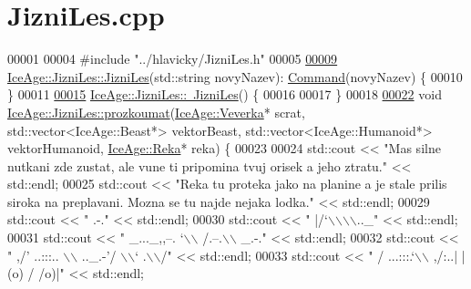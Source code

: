 \hypertarget{JizniLes_8cpp_source}{}\section{Jizni\+Les.\+cpp}
\label{JizniLes_8cpp_source}

\begin{DoxyCode}
00001 
00004 \textcolor{preprocessor}{#include "../hlavicky/JizniLes.h"}
00005 
\hypertarget{JizniLes_8cpp_source.tex_l00009}{}\hyperlink{classIceAge_1_1JizniLes_a79d20a1e507be9604e9a7b4a1d4068b0}{00009} \hyperlink{classIceAge_1_1JizniLes_a79d20a1e507be9604e9a7b4a1d4068b0}{IceAge::JizniLes::JizniLes}(std::string novyNazev):
      \hyperlink{classIceAge_1_1Command}{Command}(novyNazev) \{
00010 \}
00011 
\hypertarget{JizniLes_8cpp_source.tex_l00015}{}\hyperlink{classIceAge_1_1JizniLes_a4dbe10f16bfc6806095c30544c9a530e}{00015} \hyperlink{classIceAge_1_1JizniLes_a4dbe10f16bfc6806095c30544c9a530e}{IceAge::JizniLes::~JizniLes}() \{
00016 
00017 \}
00018 
\hypertarget{JizniLes_8cpp_source.tex_l00022}{}\hyperlink{classIceAge_1_1JizniLes_aa0b6a38d4a469a83cef58d6fd9d53430}{00022} \textcolor{keywordtype}{void} \hyperlink{classIceAge_1_1JizniLes_aa0b6a38d4a469a83cef58d6fd9d53430}{IceAge::JizniLes::prozkoumat}(\hyperlink{classIceAge_1_1Veverka}{IceAge::Veverka}* scrat, 
      std::vector<IceAge::Beast*> vektorBeast, std::vector<IceAge::Humanoid*> vektorHumanoid, 
      \hyperlink{classIceAge_1_1Reka}{IceAge::Reka}* reka) \{
00023 
00024     std::cout << \textcolor{stringliteral}{"Mas silne nutkani zde zustat, ale vune ti pripomina tvuj orisek a jeho ztratu."} << 
      std::endl;
00025     std::cout << \textcolor{stringliteral}{"Reka tu proteka jako na planine a je stale prilis siroka na preplavani. Mozna se tu najde
       nejaka lodka."} << std::endl;
00029 std::cout << \textcolor{stringliteral}{"                         .-."}                     << std::endl;
00030 std::cout << \textcolor{stringliteral}{"                        |/`\(\backslash\)\(\backslash\)\(\backslash\)\(\backslash\)..\_"}               << std::endl;
00031 std::cout << \textcolor{stringliteral}{"     \_...\_,,--.         `\(\backslash\)\(\backslash\) /.--.\(\backslash\)\(\backslash\) \_.-."}         << std::endl;
00032 std::cout << \textcolor{stringliteral}{"  ,/'  ..:::.. \(\backslash\)\(\backslash\)     ..\_.-'/    \(\backslash\)\(\backslash\)` .\(\backslash\)\(\backslash\)/"}        << std::endl;
00033 std::cout << \textcolor{stringliteral}{" /       ...:::.`\(\backslash\)\(\backslash\) ,/:..| |(o)  / /o)|"}          << std::endl;

\end{DoxyCode}
